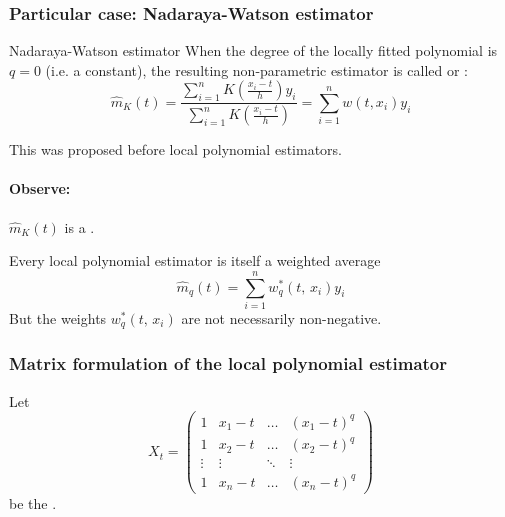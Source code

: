 \subsubsection{Particular case: Nadaraya-Watson estimator}
\begin{definition}{Nadaraya-Watson estimator}{}
	When the degree of the locally fitted polynomial is \emph{$q=0$} (i.e. a constant),
	the resulting non-parametric estimator is called 
	or :
	\begin{equation*}
		\hat m_K(t) = \frac{
			\sum_{i=1}^n K \left( \frac{x_i - t}{h} \right) y_i
		}{
			\sum_{i=1}^n K \left( \frac{x_i - t}{h} \right)
		} = \sum_{i=1}^n w(t, x_i) y_i
	\end{equation*}
	\tcblower

	This was proposed before local polynomial estimators.

	\begin{note}
		\paragraph{Observe:} $\hat m_K(t)$ is a .
	\end{note}

\end{definition}


\begin{prop}{Every local polynomial estimator is itself a weighted average}{}
	\begin{equation*}
		\hat m_{q}(t) = \sum_{i=1}^n w_q^*(t,\, x_i) y_i
	\end{equation*}
	But the weights $w_q^*(t,\, x_i)$ are not necessarily non-negative.
\end{prop}

\subsubsection{Matrix formulation of the local polynomial estimator}
Let
\begin{equation*}
	X_t = \begin{pmatrix}
		1      & x_1 - t & \ldots & (x_1 - t)^q \\
		1      & x_2 - t & \ldots & (x_2 - t)^q \\
		\vdots & \vdots  & \ddots & \vdots      \\
		1      & x_n - t & \ldots & (x_n - t)^q
	\end{pmatrix}
\end{equation*}
be the .

